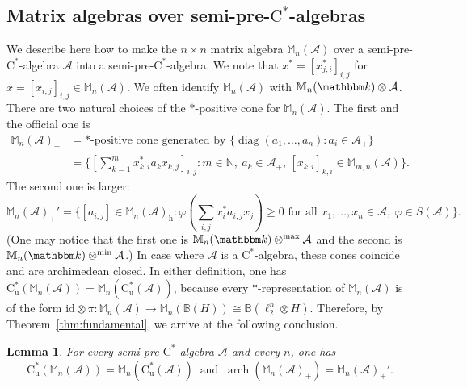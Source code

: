 \documentclass[12pt]{amsart}
\newtheorem{lem}[thm]{Lemma}
\theoremstyle{definition}
\begin{document}
\subsection{Matrix algebras over {semi-pre-$\mathrm{C}^*$-alge\-bra\xspace}{}s}
We describe here how to make the $n\times n$ matrix algebra
${{\mathbb M}}_n({{\mathcal A}})$ over a {semi-pre-$\mathrm{C}^*$-alge\-bra\xspace} ${{\mathcal A}}$
into a {semi-pre-$\mathrm{C}^*$-alge\-bra\xspace}. We note that
$x^*=[x_{j,i}^*]_{i,j}$ for $x=[x_{i,j}]_{i,j}\in{{\mathbb M}}_n({{\mathcal A}})$.
We often identify ${{\mathbb M}}_n({{\mathcal A}})$ with ${{\mathbb M}}_n({{\mathbbm k}})\otimes{{\mathcal A}}$.
There are two natural choices of the $*$-positive cone for ${{\mathbb M}}_n({{\mathcal A}})$.
The first and the official one is
\begin{align*}
{{\mathbb M}}_n({{\mathcal A}})_+ &= \mbox{$*$-positive cone generated by }\{\operatorname*{diag}(a_1,\ldots,a_n) : a_i\in{{\mathcal A}}_+\}\\
&=\{ [\sum_{k=1}^m x_{k,i}^*a_kx_{k,j}]_{i,j} : m\in{{\mathbb N}},\ a_k\in{{\mathcal A}}_+,\, [x_{k,i}]_{k,i}\in{{\mathbb M}}_{m,n}({{\mathcal A}})\}.
\end{align*}
The second one is larger:
\[
{{\mathbb M}}_n({{\mathcal A}})_+' = \{ [a_{i,j}]\in{{\mathbb M}}_n({{\mathcal A}})_{\mathrm{h}} : {\varphi}(\sum_{i,j} x_i^*a_{i,j}x_j)\geq0
\mbox{ for all }x_1,\ldots,x_n\in{{\mathcal A}},\ {\varphi}\in S({{\mathcal A}})\}.
\]
(One may notice that the first one is ${{\mathbb M}}_n({{\mathbbm k}})\otimes^{\max}{{\mathcal A}}$ and
the second is ${{\mathbb M}}_n({{\mathbbm k}})\otimes^{\min}{{\mathcal A}}$.)
In case where ${{\mathcal A}}$ is a {$\mathrm{C}^*$-alge\-bra\xspace}, these cones coincide and are archimedean closed.
In either definition, one has $\mathrm{C}^*_{\mathrm{u}}({{\mathbb M}}_n({{\mathcal A}})) = {{\mathbb M}}_n(\mathrm{C}^*_{\mathrm{u}}({{\mathcal A}}))$,
because every {$*$-repre\-sen\-ta\-tion\xspace} of ${{\mathbb M}}_n({{\mathcal A}})$ is of the form
${\mathrm{id}}\otimes\pi\colon{{\mathbb M}}_n({{\mathcal A}})\to {{\mathbb M}}_n({{\mathbb B}}({H}))\cong{{\mathbb B}}(\ell_2^n\otimes{H})$.
Therefore, by Theorem~\ref{thm:fundamental},
we arrive at the following conclusion.
\begin{lem}\label{lem:matspc}
For every {semi-pre-$\mathrm{C}^*$-alge\-bra\xspace} ${{\mathcal A}}$ and every $n$, one has
\[
\mathrm{C}^*_{\mathrm{u}}({{\mathbb M}}_n({{\mathcal A}})) = {{\mathbb M}}_n(\mathrm{C}^*_{\mathrm{u}}({{\mathcal A}}))
\ \mbox{ and }\
\operatorname*{arch}({{\mathbb M}}_n({{\mathcal A}})_+)={{\mathbb M}}_n({{\mathcal A}})_+'.
\]
\end{lem}
\end{document}
